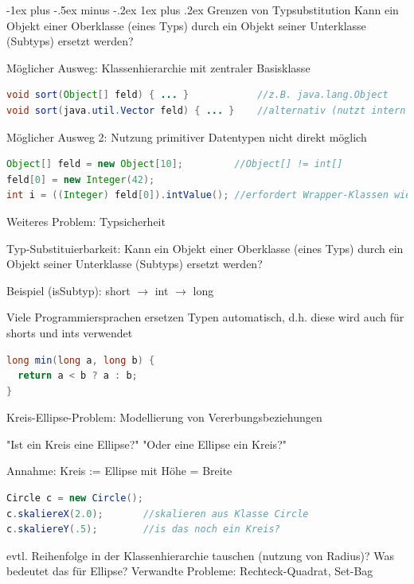 \documentclass[10pt]{article}
\makeatletter
\renewcommand{\subsubsection}{\@startsection{subsubsection}{3}{0mm}%
                                {-1ex plus -.5ex minus -.2ex}%
                                {1ex plus .2ex}%
                                {\normalfont\small\bfseries}}
\makeatother
\begin{document}
\subsubsection{Grenzen von Typsubstitution}
Kann ein Objekt einer Oberklasse (eines Typs) durch ein Objekt seiner Unterklasse (Subtyps) ersetzt werden?

Möglicher Ausweg: Klassenhierarchie mit zentraler Basisklasse
\begin{lstlisting}[language=java]
void sort(Object[] feld) { ... }            //z.B. java.lang.Object
void sort(java.util.Vector feld) { ... }    //alternativ (nutzt intern Object)
\end{lstlisting}

Möglicher Ausweg 2: Nutzung primitiver Datentypen nicht direkt möglich
\begin{lstlisting}[language=java]
Object[] feld = new Object[10];         //Object[] != int[]
feld[0] = new Integer(42);
int i = ((Integer) feld[0]).intValue(); //erfordert Wrapper-Klassen wie java.lang.Integer
\end{lstlisting}

Weiteres Problem: Typsicherheit

Typ-Substituierbarkeit: Kann ein Objekt einer Oberklasse (eines Typs) durch ein Objekt seiner Unterklasse (Subtyps) ersetzt werden?

Beispiel (isSubtyp): short $\rightarrow$ int $\rightarrow$ long 

Viele Programmiersprachen ersetzen Typen automatisch, d.h. diese wird auch für shorts und ints verwendet
\begin{lstlisting}[language=java]
long min(long a, long b) {
  return a < b ? a : b;
}
\end{lstlisting}

Kreis-Ellipse-Problem: Modellierung von Vererbungsbeziehungen
\begin{itemize*}
  \item "Ist ein Kreis eine Ellipse?" "Oder eine Ellipse ein Kreis?"
  \item Annahme: Kreis := Ellipse mit Höhe = Breite
\end{itemize*}
\begin{lstlisting}[language=java]
Circle c = new Circle();  
c.skaliereX(2.0);       //skalieren aus Klasse Circle
c.skaliereY(.5);        //is das noch ein Kreis?
\end{lstlisting}

evtl. Reihenfolge in der Klassenhierarchie tauschen (nutzung von Radius)? Was bedeutet das für Ellipse?
Verwandte Probleme: Rechteck-Quadrat, Set-Bag
\end{document}
